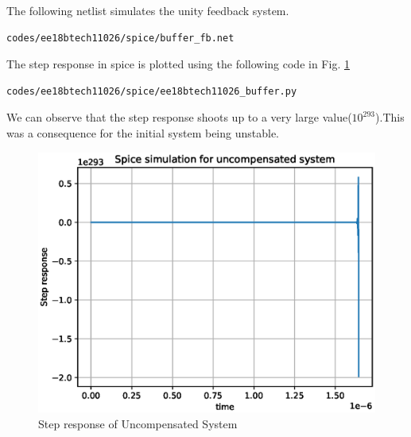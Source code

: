\begin{enumerate}[label=\arabic*.,ref=\theenumi]
The following netlist simulates the unity feedback system. 
\begin{lstlisting}
codes/ee18btech11026/spice/buffer_fb.net
\end{lstlisting}
 The step response in spice is plotted using the following code in Fig. \ref{fig:ee18btech11026_buffer}
 \begin{lstlisting}
codes/ee18btech11026/spice/ee18btech11026_buffer.py
\end{lstlisting}

We can observe that the step response shoots up to a very large value($10^{293}$).This was a consequence for the initial system being unstable.
\begin{figure}[!h]
    \centering
    \includegraphics[width=\columnwidth]{./figs/ee18btech11026/ee18btech11026_spice_result_buffer.eps}
    \caption{Step response of Uncompensated System}
    \label{fig:ee18btech11026_buffer}
\end{figure}


\end{enumerate}
